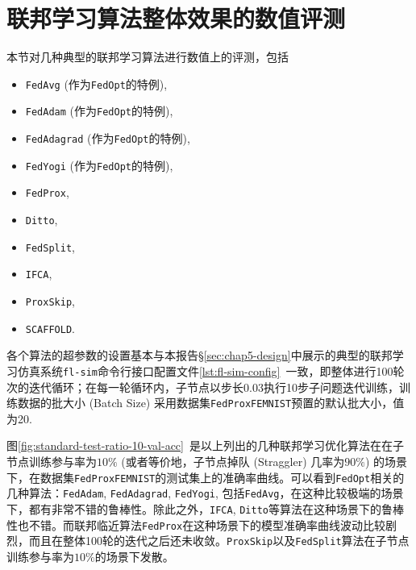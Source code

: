 \section{联邦学习算法整体效果的数值评测}
\label{sec:chap6-overall}


本节对几种典型的联邦学习算法进行数值上的评测，包括
\begin{itemize}
    \item \texttt{FedAvg}\cite{mcmahan2017fed_avg} (作为\texttt{FedOpt}\cite{reddi2020fed_opt}的特例),
    \item \texttt{FedAdam}\cite{reddi2020fed_opt, adam} (作为\texttt{FedOpt}\cite{reddi2020fed_opt}的特例),
    \item \texttt{FedAdagrad}\cite{reddi2020fed_opt, adagrad} (作为\texttt{FedOpt}\cite{reddi2020fed_opt}的特例),
    \item \texttt{FedYogi}\cite{reddi2020fed_opt, Zaheer_2018_yogi} (作为\texttt{FedOpt}\cite{reddi2020fed_opt}的特例),
    \item \texttt{FedProx}\cite{sahu2018fedprox},
    \item \texttt{Ditto}\cite{li_2021_ditto},
    \item \texttt{FedSplit}\cite{pathak2020fedsplit},
    \item \texttt{IFCA}\cite{Ghosh_2022_cfl},
    \item \texttt{ProxSkip}\cite{proxskip},
    \item \texttt{SCAFFOLD}\cite{karimireddy2020scaffold}.
\end{itemize}
各个算法的超参数的设置基本与本报告\S\ref{sec:chap5-design}中展示的典型的联邦学习仿真系统\texttt{fl-sim}命令行接口配置文件\ref{lst:fl-sim-config}~一致，即整体进行100轮次的迭代循环；在每一轮循环内，子节点以步长0.03执行10步子问题迭代训练，训练数据的批大小 (Batch Size) 采用数据集\texttt{FedProxFEMNIST}预置的默认批大小，值为20.

图\ref{fig:standard-test-ratio-10-val-acc}~是以上列出的几种联邦学习优化算法在在子节点训练参与率为$10\%$ (或者等价地，子节点掉队 (Straggler) 几率为$90\%$) 的场景下，在数据集\texttt{FedProxFEMNIST}的测试集上的准确率曲线。可以看到\texttt{FedOpt}相关的几种算法：\texttt{FedAdam}, \texttt{FedAdagrad}, \texttt{FedYogi}, 包括\texttt{FedAvg}，在这种比较极端的场景下，都有非常不错的鲁棒性。除此之外，\texttt{IFCA}, \texttt{Ditto}等算法在这种场景下的鲁棒性也不错。而联邦临近算法\texttt{FedProx}在这种场景下的模型准确率曲线波动比较剧烈，而且在整体100轮的迭代之后还未收敛。\texttt{ProxSkip}以及\texttt{FedSplit}算法在子节点训练参与率为$10\%$的场景下发散。

